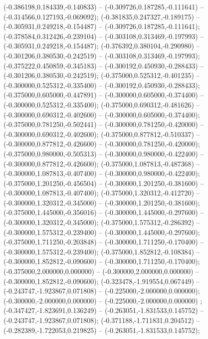  (-0.386198,0.184339,-0.140833) -- (-0.309726,0.187285,-0.111641) -- (-0.314566,0.127193,-0.069092);
 (-0.381835,0.247327,-0.189175) -- (-0.305931,0.249218,-0.154487) -- (-0.309726,0.187285,-0.111641);
 (-0.378584,0.312426,-0.239104) -- (-0.303108,0.313469,-0.197993) -- (-0.305931,0.249218,-0.154487);
 (-0.376392,0.380104,-0.290980) -- (-0.301206,0.380530,-0.242519) -- (-0.303108,0.313469,-0.197993);
 (-0.375222,0.450859,-0.345183) -- (-0.300192,0.450930,-0.288433) -- (-0.301206,0.380530,-0.242519);
 (-0.375000,0.525312,-0.401235) -- (-0.300000,0.525312,-0.335400) -- (-0.300192,0.450930,-0.288433);
 (-0.375000,0.605000,-0.447891) -- (-0.300000,0.605000,-0.374400) -- (-0.300000,0.525312,-0.335400);
 (-0.375000,0.690312,-0.481626) -- (-0.300000,0.690312,-0.402600) -- (-0.300000,0.605000,-0.374400);
 (-0.375000,0.781250,-0.502441) -- (-0.300000,0.781250,-0.420000) -- (-0.300000,0.690312,-0.402600);
 (-0.375000,0.877812,-0.510337) -- (-0.300000,0.877812,-0.426600) -- (-0.300000,0.781250,-0.420000);
 (-0.375000,0.980000,-0.505313) -- (-0.300000,0.980000,-0.422400) -- (-0.300000,0.877812,-0.426600);
 (-0.375000,1.087813,-0.487368) -- (-0.300000,1.087813,-0.407400) -- (-0.300000,0.980000,-0.422400);
 (-0.375000,1.201250,-0.456504) -- (-0.300000,1.201250,-0.381600) -- (-0.300000,1.087813,-0.407400);
 (-0.375000,1.320312,-0.412720) -- (-0.300000,1.320312,-0.345000) -- (-0.300000,1.201250,-0.381600);
 (-0.375000,1.445000,-0.356016) -- (-0.300000,1.445000,-0.297600) -- (-0.300000,1.320312,-0.345000);
 (-0.375000,1.575312,-0.286392) -- (-0.300000,1.575312,-0.239400) -- (-0.300000,1.445000,-0.297600);
 (-0.375000,1.711250,-0.203848) -- (-0.300000,1.711250,-0.170400) -- (-0.300000,1.575312,-0.239400);
 (-0.375000,1.852812,-0.108384) -- (-0.300000,1.852812,-0.090600) -- (-0.300000,1.711250,-0.170400);
 (-0.375000,2.000000,0.000000) -- (-0.300000,2.000000,0.000000) -- (-0.300000,1.852812,-0.090600);
 (-0.323478,-1.919554,0.067449) -- (-0.243747,-1.923867,0.071808) -- (-0.225000,-2.000000,0.000000);
 (-0.300000,-2.000000,0.000000) -- (-0.225000,-2.000000,0.000000) ;
 (-0.347427,-1.823691,0.136249) -- (-0.263051,-1.831533,0.145752) -- (-0.243747,-1.923867,0.071808);
 (-0.371188,-1.711831,0.204512) -- (-0.282389,-1.722053,0.219825) -- (-0.263051,-1.831533,0.145752);
